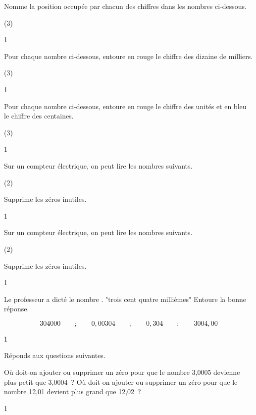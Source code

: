 \documentclass[a4paper,11pt]{report}
\begin{document}
\begin{exo}{ Nomme la position occupée par chacun des chiffres dans les nombres ci-dessous.
\begin{tasks}[after-item-skip = 0.5em](3)
\end{tasks}

}{1}\end{exo}
\begin{exop}{ Pour chaque nombre ci-dessous, entoure en rouge le chiffre des dizaine de milliers.
\begin{tasks}[after-item-skip = 0.5em](3)
\end{tasks}

}{1}\end{exop}
\begin{exop}{ Pour chaque nombre ci-dessous, entoure en rouge le chiffre des  unités et en bleu le chiffre des centaines.
\begin{tasks}[after-item-skip = 0.5em](3)
\end{tasks}

}{1}\end{exop}
\begin{exo}{ Sur un compteur électrique, on peut lire les nombres suivants.
\begin{tasks}[after-item-skip = 0.5em](2)
\end{tasks}

Supprime les zéros inutiles.
}{1}\end{exo}

\begin{exop}{ Sur un compteur électrique, on peut lire les nombres suivants.
\begin{tasks}[after-item-skip = 0.5em](2)
\end{tasks}

Supprime les zéros inutiles.
}{1}\end{exop}


\begin{exop}{ Le professeur a dicté le nombre . "trois cent quatre millièmes" Entoure la bonne réponse.

		\[304000 \qquad ;\qquad 0,00304 \qquad ;\qquad 0,304 \qquad ;\qquad 3004,00\]

}{1}\end{exop}
\begin{exo}{ Réponds aux questions suivantes.
\begin{tasks}[after-item-skip = 0.5em]
\task Où doit-on ajouter ou supprimer un zéro pour que le nombre 3,0005 devienne plus petit que 3,0004~?
\task Où doit-on ajouter ou supprimer un zéro pour que le nombre 12,01 devient plus grand que 12,02~?
\end{tasks}
}{1}\end{exo}
\end{document}
